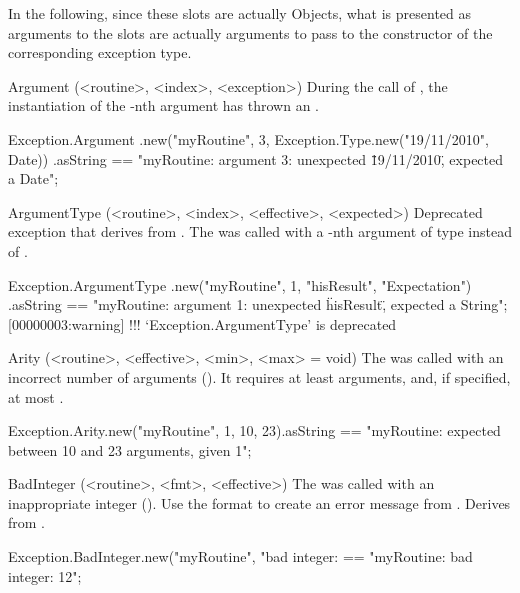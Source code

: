 In the following, since these slots are actually Objects, what is presented
as arguments to the slots are actually arguments to pass to the constructor
of the corresponding exception type.
\begin{urbiscriptapi}
\item[Argument](<routine>, <index>, <exception>)
  During the call of , the instantiation of the -nth
  argument has thrown an .
\begin{urbiassert}
Exception.Argument
  .new("myRoutine", 3, Exception.Type.new("19/11/2010", Date))
  .asString
== "myRoutine: argument 3: unexpected \"19/11/2010\", expected a Date";
\end{urbiassert}


\item[ArgumentType](<routine>, <index>, <effective>, <expected>)%
  Deprecated exception that derives from .  The 
  was called with a -nth argument of type  instead
  of .
\begin{urbiassert}
Exception.ArgumentType
  .new("myRoutine", 1, "hisResult", "Expectation")
  .asString
== "myRoutine: argument 1: unexpected \"hisResult\", expected a String";
[00000003:warning] !!! `Exception.ArgumentType' is deprecated
\end{urbiassert}


\item[Arity](<routine>, <effective>, <min>, <max> = void)%
  The  was called with an incorrect number of arguments
  ().  It requires at least  arguments, and,
  if specified, at most .
\begin{urbiassert}
Exception.Arity.new("myRoutine", 1, 10, 23).asString
  == "myRoutine: expected between 10 and 23 arguments, given 1";
\end{urbiassert}


\item[BadInteger](<routine>, <fmt>, <effective>)%
  The  was called with an inappropriate integer
  ().  Use the format  to create an error
  message from .  Derives from
  .
\begin{urbiassert}
Exception.BadInteger.new("myRoutine", "bad integer: %
  == "myRoutine: bad integer: 12";
\end{urbiassert}



\end{urbiscriptapi}
